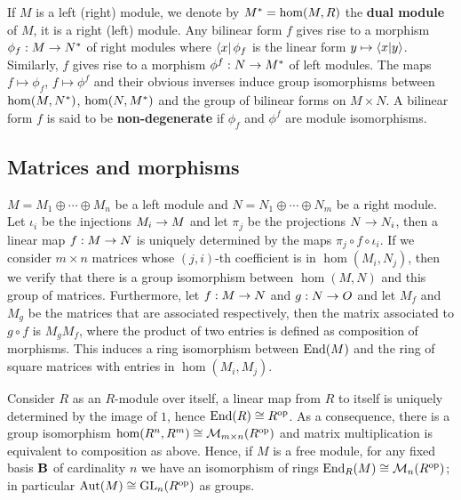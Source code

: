 If $M$ is a left (right) module, we denote by $M^\ast=\hom(M,R)$ the
\textbf{dual
  module} of $M$, it is a right (left) module.
Any bilinear form $f$ gives rise to a morphism $ \phi_f : M \rightarrow
N^\ast$ of right modules where $\left\langle x \right\rvert\phi_f$ is the linear form $y
\mapsto \left\langle x \middle| y \right\rangle$. Similarly, $f$ gives rise to a morphism
$\phi^f:N\rightarrow M^\ast$ of left modules. The maps $f\mapsto\phi_f$,
$f\mapsto\phi^f$ and their obvious inverses induce group isomorphisms
between $\hom(M,N^\ast)$, $\hom(N,M^\ast)$ and the group of
bilinear forms on $M\times N$.  A bilinear form $f$ is said to be
\textbf{non-degenerate} if $\phi_f$
and $\phi^f$ are module isomorphisms.


\subsection{Matrices and morphisms}
\label{sec:linear-algebra:matrices}
$M=M_1\oplus\cdots\oplus M_n$ be a left module and
$N=N_1\oplus\cdots\oplus N_m$ be a right module.  Let $\iota_i$ be the
injections $M_i\rightarrow M$ and let $\pi_j$ be the projections $N\rightarrow N_i$,
then a linear map $f:M\rightarrow N$ is uniquely determined by the maps
$\pi_j\circ f\circ\iota_i$. If we consider $m\times n$ matrices whose
$(j,i)$-th coefficient is in $\hom(M_i,N_j)$, then we verify that
there is a group isomorphism between $\hom(M,N)$ and this group of
matrices. Furthermore, let $f:M\rightarrow N$ and $g:N\rightarrow O$ and let $M_f$ and
$M_g$ be the matrices that are associated respectively, then the
matrix associated to $g\circ f$ is $M_gM_f$, where the product of two
entries is defined as composition of morphisms. This induces a ring
isomorphism between $\operatorname{End}(M)$ and the ring of square matrices with
entries in $\hom(M_i,M_j)$.

Consider $R$ as an $R$-module over itself, a linear map from $R$ to
itself is uniquely determined by the image of $1$, hence $\operatorname{End}(R)\cong
R^{\mathrm{op}}$. As a consequence, there is a group isomorphism
$\hom(R^n,R^m)\cong\operatorname{\mathcal{M}}_{m\times n}(R^{\mathrm{op}})$ and matrix multiplication
is equivalent to composition as above.  Hence, if $M$ is a free
module, for any fixed basis $\mathbf{B}$ of cardinality $n$ we have an
isomorphism of rings $\operatorname{End}_R(M)\cong\operatorname{\mathcal{M}}_n(R^{\mathrm{op}})$; in particular
$\operatorname{Aut}(M)\cong\operatorname{GL}_n(R^{\mathrm{op}})$ as groups.

